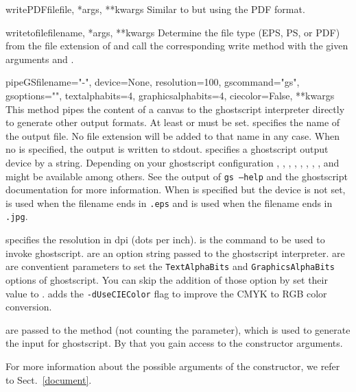 \begin{methoddesc}{writePDFfile}{file, *args, **kwargs}
  Similar to  but using the PDF format.
\end{methoddesc}

\begin{methoddesc}{writetofile}{filename, *args, **kwargs}
  Determine the file type (EPS, PS, or PDF) from the file extension
  of  and call the corresponding write method with
  the given arguments  and .
\end{methoddesc}

\begin{methoddesc}{pipeGS}{filename="-", device=None, resolution=100,
                           gscommand="gs", gsoptions="",
                           textalphabits=4, graphicsalphabits=4,
                           ciecolor=False, **kwargs}
  This method pipes the content of a canvas to the ghostscript
  interpreter directly to generate other output formats. At least
   or  must be set.  specifies
  the name of the output file. No file extension will be added to that
  name in any case. When no  is specified, the output is
  written to stdout.  specifies a ghostscript output
  device by a string. Depending on your ghostscript configuration
  , , , ,
  , , ,
  , and  might be available among
  others. See the output of \texttt{gs --help} and the ghostscript
  documentation for more information. When  is specified
  but the device is not set,  is used when the filename
  ends in \texttt{.eps} and  is used when the filename
  ends in \texttt{.jpg}.

   specifies the resolution in dpi (dots per inch).
   is the command to be used to invoke ghostscript.
   are an option string passed to the ghostscript
  interpreter.  are  are
  conventient parameters to set the \texttt{TextAlphaBits} and
  \texttt{GraphicsAlphaBits} options of ghostscript. You can skip
  the addition of those option by set their value to .
   adds the \texttt{-dUseCIEColor} flag to improve
  the CMYK to RGB color conversion.

   are passed to the  method (not
  counting the  parameter), which is used to generate the
  input for ghostscript. By that you gain access to the
   constructor arguments.
\end{methoddesc}

For more information about the possible arguments of the
 constructor, we refer to Sect.~\ref{document}.

